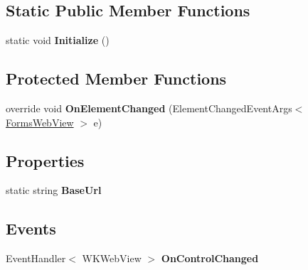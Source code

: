 \subsection*{Static Public Member Functions}
\begin{DoxyCompactItemize}
\item 
\mbox{\label{class_xam_1_1_plugin_1_1_web_view_1_1i_o_s_1_1_forms_web_view_renderer_a60aebbafb3fc1f831510706aff82c084}} 
static void {\bfseries Initialize} ()
\end{DoxyCompactItemize}
\subsection*{Protected Member Functions}
\begin{DoxyCompactItemize}
\item 
\mbox{\label{class_xam_1_1_plugin_1_1_web_view_1_1i_o_s_1_1_forms_web_view_renderer_a570444897e6afb58ea600172f8043566}} 
override void {\bfseries On\+Element\+Changed} (Element\+Changed\+Event\+Args$<$ \hyperlink{class_xam_1_1_plugin_1_1_web_view_1_1_abstractions_1_1_forms_web_view}{Forms\+Web\+View} $>$ e)
\end{DoxyCompactItemize}
\subsection*{Properties}
\begin{DoxyCompactItemize}
\item 
\mbox{\label{class_xam_1_1_plugin_1_1_web_view_1_1i_o_s_1_1_forms_web_view_renderer_addb3ecfcad46178f67bed9b9d9536631}} 
static string {\bfseries Base\+Url}
\end{DoxyCompactItemize}
\subsection*{Events}
\begin{DoxyCompactItemize}
\item 
\mbox{\label{class_xam_1_1_plugin_1_1_web_view_1_1i_o_s_1_1_forms_web_view_renderer_a65898c6ca46c5b9ae0e94f75b5f4c6af}} 
Event\+Handler$<$ W\+K\+Web\+View $>$ {\bfseries On\+Control\+Changed}
\end{DoxyCompactItemize}



